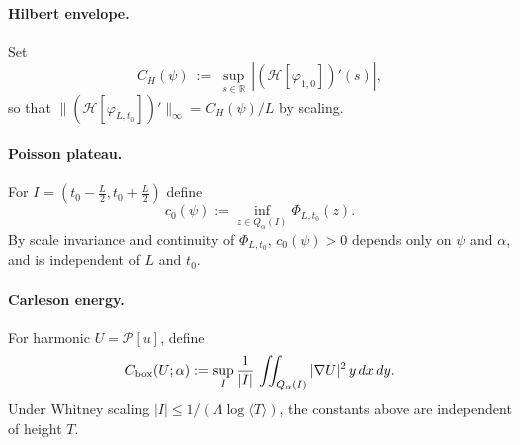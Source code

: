 \paragraph{Hilbert envelope.}
Set
\[C_H(\psi)\ :=\ \sup_{s\in\mathbb{R}}\,\left|(\mathcal H[\varphi_{1,0}])'(s)\right|,\]
so that $\|(\mathcal H[\varphi_{L,t_0}])'\|_\infty= C_H(\psi)/L$ by scaling.

\paragraph{Poisson plateau.}
For $I=(t_0-\tfrac{L}{2},t_0+\tfrac{L}{2})$ define
\[c_0(\psi):=\inf_{z\in Q_\alpha(I)} \Phi_{L,t_0}(z).\]
By scale invariance and continuity of $\Phi_{L,t_0}$, $c_0(\psi)>0$ depends only on $\psi$ and $\alpha$, and is independent of $L$ and $t_0$.

\paragraph{Carleson energy.}
For harmonic $U=\mathcal P[u]$, define
\[C_{\rm box}(U;\alpha):=\sup_I \frac{1}{|I|}\,\iint_{Q_\alpha(I)} |\nabla U|^2\,y\,dx\,dy.\]
Under Whitney scaling $|I|\le 1/(\Lambda\log\langle T\rangle)$, the constants above are independent of height $T$.
